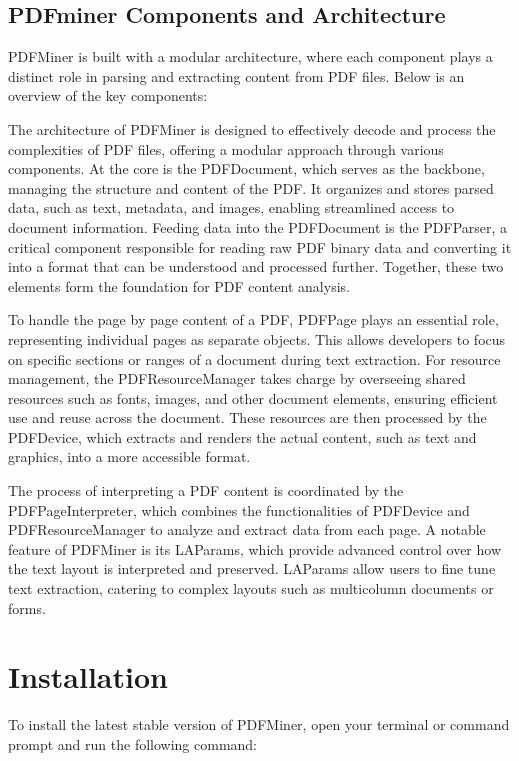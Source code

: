 \subsection{PDFminer Components and Architecture}

PDFMiner is built with a modular architecture, where each component plays a distinct role in parsing and extracting content from PDF files. Below is an overview of the key components: 

The architecture of PDFMiner is designed to effectively decode and process the complexities of PDF files, offering a modular approach through various components. At the core is the PDFDocument, which serves as the backbone, managing the structure and content of the PDF. It organizes and stores parsed data, such as text, metadata, and images, enabling streamlined access to document information. Feeding data into the PDFDocument is the PDFParser, a critical component responsible for reading raw PDF binary data and converting it into a format that can be understood and processed further. Together, these two elements form the foundation for PDF content analysis.\cite{Python:2024Pdfminer} 

To handle the page by page content of a PDF, PDFPage plays an essential role, representing individual pages as separate objects. This allows developers to focus on specific sections or ranges of a document during text extraction. For resource management, the PDFResourceManager takes charge by overseeing shared resources such as fonts, images, and other document elements, ensuring efficient use and reuse across the document. These resources are then processed by the PDFDevice, which extracts and renders the actual content, such as text and graphics, into a more accessible format.

The process of interpreting a PDF content is coordinated by the PDFPageInterpreter, which combines the functionalities of PDFDevice and PDFResourceManager to analyze and extract data from each page. A notable feature of PDFMiner is its LAParams, which provide advanced control over how the text layout is interpreted and preserved. LAParams allow users to fine tune text extraction, catering to complex layouts such as multicolumn documents or forms.\cite{Shinyama:2019}


\section{Installation} 

To install the latest stable version of PDFMiner, open your terminal or command prompt and run the following command:

